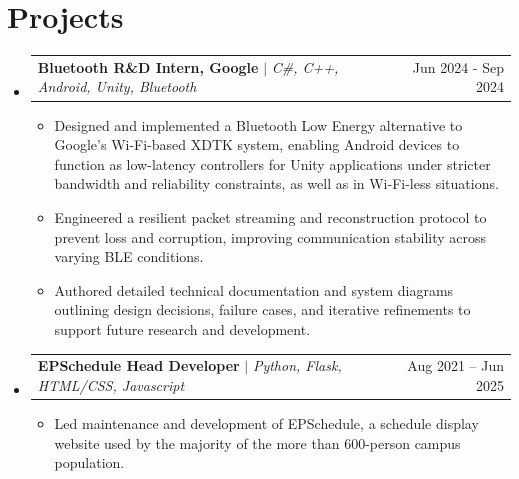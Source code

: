 \documentclass[letterpaper,11pt]{article}
\makeatletter
\newcommand{\resumeItem}[1]{
  \item\small{
    {#1 \vspace{-2pt}}
  }
}
\newcommand{\resumeProjectHeading}[2]{
    \item
    \begin{tabular*}{0.97\textwidth}{l@{\extracolsep{\fill}}r}
      \small#1 & #2 \\
    \end{tabular*}\vspace{-7pt}
}
\newcommand{\resumeSubHeadingListStart}{\begin{itemize}[leftmargin=0.15in, label={}]}
\newcommand{\resumeSubHeadingListEnd}{\end{itemize}}
\newcommand{\resumeItemListStart}{\begin{itemize}}
\newcommand{\resumeItemListEnd}{\end{itemize}\vspace{-5pt}}
\makeatother
\begin{document}
\section{Projects}
    \resumeSubHeadingListStart
    \resumeProjectHeading
          {\textbf{Bluetooth R\&D Intern, Google} $|$ \emph{C\#, C++, Android, Unity, Bluetooth}}{Jun 2024 - Sep 2024}
          \resumeItemListStart
            \resumeItem{Designed and implemented a Bluetooth Low Energy alternative to Google's Wi-Fi-based XDTK system, enabling Android devices to function as low-latency controllers for Unity applications under stricter bandwidth and reliability constraints, as well as in Wi-Fi-less situations.}
            \resumeItem{Engineered a resilient packet streaming and reconstruction protocol to prevent loss and corruption, improving communication stability across varying BLE conditions.}
            \resumeItem{Authored detailed technical documentation and system diagrams outlining design decisions, failure cases, and iterative refinements to support future research and development.}
          \resumeItemListEnd

      \resumeProjectHeading
          {\textbf{EPSchedule Head Developer} $|$ \emph{Python, Flask, HTML/CSS, Javascript}}{Aug 2021 -- Jun 2025}
          \resumeItemListStart
            \resumeItem{Led maintenance and development of EPSchedule, a schedule display website used by the majority of the more than 600-person campus population.}
          \resumeItemListEnd

    \resumeSubHeadingListEnd
\end{document}
